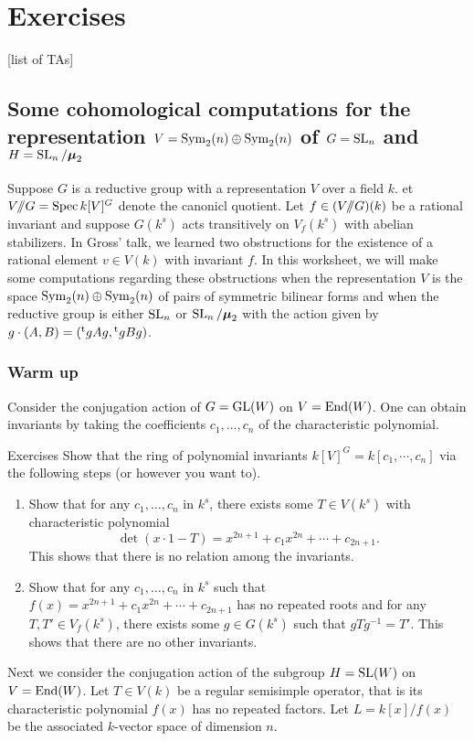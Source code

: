 
\section{Exercises}





[list of TAs]





\subsection{Some cohomological computations for the representation \texorpdfstring{$V=\operatorname{Sym}_2(n)\oplus \operatorname{Sym}_2(n)$}{V=Sym2(n)+Sym2(n)} of \texorpdfstring{$G=\operatorname{SL}_n$}{G=SLn} and \texorpdfstring{$H=\operatorname{SL}_n/\boldsymbol\mu_2$}{H=SL2/mu2}}

Suppose $G$ is a reductive group with a representation $V$ over a field $k$. 
et $V/\!\!/ G=\operatorname{Spec} k[V]^G$ denote the canonicl quotient. Let 
$f\in (V/\!\!/ G)(k)$ be a rational invariant and suppose $G(k^s)$ acts 
transitively on $V_f(k^s)$ with abelian stabilizers. In Gross' talk, we 
learned two obstructions for the existence of a rational element $v\in V(k)$ 
with invariant $f$. In this worksheet, we will make some computations regarding 
these obstructions when the representation $V$ is the space 
$\operatorname{Sym}_2(n)\oplus\operatorname{Sym}_2(n)$ of pairs of symmetric bilinear forms and 
when the reductive group is either $\operatorname{SL}_n$ or 
$\operatorname{SL}_n/\boldsymbol\mu_2$ with the action given by 
$g\cdot (A,B)=(\prescript{\mathrm{t}}{}{g} A g, \prescript{\mathrm{t}}{}{g} B g)$. 


\subsubsection{Warm up}

Consider the conjugation action of $G=\operatorname{GL}(W)$ on $V=\operatorname{End}(W)$. One 
can obtain invariants by taking the coefficients $c_1,\dots,c_n$ of the 
characteristic polynomial. 

\begin{enonce*}[remark]{Exercises}
Show that the ring of polynomial invariants $k[V]^G=k[c_1,\cdots,c_n]$ via the 
following steps (or however you want to). 
\begin{enumerate}
  \item Show that for any $c_1,\dots,c_n$ in $k^s$, there exists some 
    $T\in V(k^s)$ with characteristic polynomial 
    \[
      \det(x\cdot 1-T) = x^{2n+1} + c_1 x^{2n} + \cdots + c_{2n+1} .
    \]
    This shows that there is no relation among the invariants. 
  \item Show that for any $c_1,\dots,c_n$ in $k^s$ such that 
    $f(x)=x^{2n+1} + c_1 x^{2n} + \cdots + c_{2n+1}$ has no repeated roots and 
    for any $T,T'\in V_f(k^s)$, there exists some $g\in G(k^s)$ such that 
    $g T g^{-1} = T'$. This shows that there are no other invariants. 
\end{enumerate}
\end{enonce*}

Next we consider the conjugation action of the subgroup $H=\operatorname{SL}(W)$ 
on $V=\operatorname{End}(W)$. Let $T\in V(k)$ be a regular semisimple operator, that is its 
characteristic polynomial $f(x)$ has no repeated factors. Let $L=k[x]/f(x)$ be 
the associated $k$-vector space of dimension $n$. 




